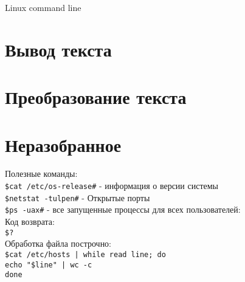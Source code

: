 \documentclass[12pt, a4paper]{article}
\newcommand{\ci}[1]{\indent\texttt{#1} \\}
\newcommand{\cci}[2]{\indent\texttt{#1\indent \#} - #2 \\}
\begin{document}
	
	\begin{center} {\Huge Linux command line} \end{center}
	
	\tableofcontents
	
	
	
	
	
	
	
	

	\section{Вывод текста}
	
	
	
	\section{Преобразование текста}
	
		
	
	
	

	
	
	
	
	


\section{Неразобранное}
\noindent Полезные команды: \\
\cci{\$cat /etc/os-release}{информация о версии системы}
\cci{\$netstat -tulpen}{Открытые порты}
\cci{\$ps -uax}{все запущенные процессы для всех пользователей:}

\noindent Код возврата: \\
\ci{\$?}

\noindent Обработка файла построчно:\\
\ci{\$cat /etc/hosts | while read line; do}
\ci{\indent echo "\$line" | wc -c}
\ci{done}

	
\end{document}
